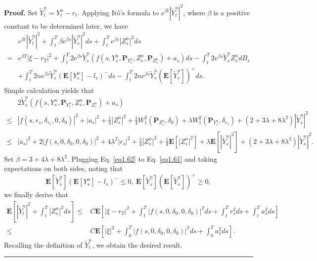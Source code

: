 \documentclass[10pt]{article}%
\numberwithin{equation}{section}
\newenvironment{proof}[1][Proof]{\noindent \textbf{#1.} }{\  \rule{0.5em}{0.5em}}
\def \E{\mathbf{E}}
\def \P{\mathbf{P}}
\begin{document}
\begin{proof}
Set $\widetilde{Y}^n_t=Y^n_t-r_t$. Applying It\^{o}'s formula to $e^{\beta t}|\widetilde{Y}^n_t|^2$, where $\beta$ is a positive constant to be determined later, we have
\begin{equation}\label{eq1.61}\begin{split}
&e^{\beta t}|\widetilde{Y}^n_t|^2+\int_t^T \beta e^{\beta s}|\widetilde{Y}^n_s|^2 ds+\int_t^T e^{\beta s}\left|Z_s^n\right|^2 ds\\
=&e^{\beta T}|\xi-r_T|^2+\int_t^T 2e^{\beta s}\widetilde{Y}^n_s\left(f(s,Y_s^n,\P_{Y^n_s},Z_s^n,\P_{Z^n_s})+a_s\right)ds-\int_t^T 2e^{\beta s}\widetilde{Y}_s^n Z_s^ndB_s\\
&+\int_t^T 2ne^{\beta s}\widetilde{Y}_s^n\left(\E[Y_s^n]-l_s\right)^-ds-\int_t^T 2ne^{\beta s}\widetilde{Y}_s^n(\E[\widetilde{Y}_s^n])^+ ds.
\end{split}\end{equation}
Simple calculation yields that 
\begin{equation}\label{eq1.62}\begin{split}
&2\widetilde{Y}^n_s\left(f(s,Y_s^n,\P_{Y^n_s},Z_s^n,\P_{Z^n_s})+a_s\right)\\
\leq &|f(s,r_s,\delta_{r_s},0,\delta_0)|^2+|a_s|^2+\frac{1}{4}|Z^n_s|^2+\frac{1}{4}W_1^2(\P_{Z^n_s},\delta_{0})+\lambda W_1^2(\P_{{Y}^n_s},\delta_{r_s})+(2+3\lambda+8\lambda^2)|\widetilde{Y}^n_s|^2\\
\leq &|a_s|^2+2|f(s,0,\delta_0,0,\delta_0)|^2+4\lambda^2|r_s|^2+\frac{1}{4}|Z^n_s|^2+\frac{1}{4}\E[|Z^n_s|^2]+\lambda \E[|\widetilde{Y}^n_s|^2]+(2+3\lambda+8\lambda^2)|\widetilde{Y}^n_s|^2.
\end{split}\end{equation}
Set $\beta=3+4\lambda+8\lambda^2$. Plugging Eq. \eqref{eq1.62} to Eq. \eqref{eq1.61} and taking expectations on both sides, noting that \begin{displaymath}
\E[\widetilde{Y}^n_s](\E[Y_s^n]-l_s)^-\leq 0,\ \E[\widetilde{Y}^n_s](\E[\widetilde{Y}_s^n])^+\geq 0,
\end{displaymath}
 we finally derive that
\begin{align*}
\E\left[|\widetilde{Y}_t^n|^2+\int_t^T |Z^n_s|^2 ds\right]\leq &C\E\left[|\xi-r_T|^2+\int_t^T |f(s,0,\delta_0,0,\delta_0)|^2ds+\int_t^T r_s^2ds+\int_t^T a_s^2ds\right]\\
\leq &C\E\left[|\xi|^2+\int_0^T |f(s,0,\delta_0,0,\delta_0)|^2ds+\int_0^T a_s^2ds\right].
\end{align*}
Recalling the definition of $\widetilde{Y}^n_t$, we obtain the desired result.
\end{proof}
\end{document}
